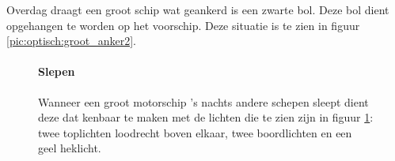 \vspace{-0.6cm}
Overdag draagt een groot schip wat geankerd is een zwarte bol. Deze bol dient opgehangen te worden op het voorschip. Deze situatie is te zien in figuur \ref{pic:optisch:groot_anker2}.

\begin{figure}[H]
	\centering
	\begin{minipage}[t]{0.50\textwidth}
		\paragraph{Slepen}
		Wanneer een groot motorschip 's nachts andere schepen sleept dient deze dat kenbaar te maken met de lichten die te zien zijn in figuur \ref{pic:optisch:groot_sleep}: twee toplichten loodrecht boven elkaar, twee boordlichten en een geel heklicht.
	\end{minipage}
	\hfill
	\begin{minipage}[t]{0.22\textwidth}
		\RemoveLine
		\caption{}
		\label{pic:optisch:groot_sleep}
	\end{minipage}
	\hfill
	\begin{minipage}[t]{0.22\textwidth}

\end{minipage}
\end{figure}
